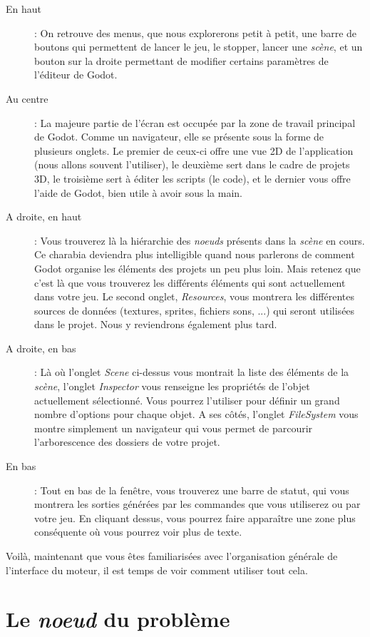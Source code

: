 \begin{description}
\item[En haut] : On retrouve des menus, que nous explorerons petit à petit, une barre de boutons qui permettent de lancer le jeu, le stopper, lancer une \emph{scène}, et un bouton sur la droite permettant de modifier certains paramètres de l'éditeur de Godot.
\item[Au centre] : La majeure partie de l'écran est occupée par la zone de travail principal de Godot. Comme un navigateur, elle se présente sous la forme de plusieurs onglets. Le premier de ceux-ci offre une vue 2D de l'application (nous allons souvent l'utiliser), le deuxième sert dans le cadre de projets 3D, le troisième sert à éditer les scripts (le code), et le dernier vous offre l'aide de Godot, bien utile à avoir sous la main.
\item[A droite, en haut] : Vous trouverez là la hiérarchie des \emph{noeuds} présents dans la \emph{scène} en cours. Ce charabia deviendra plus intelligible quand nous parlerons de comment Godot organise les éléments des projets un peu plus loin. Mais retenez que c'est là que vous trouverez les différents éléments qui sont actuellement dans votre jeu. Le second onglet, \emph{Resources}, vous montrera les différentes sources de données (textures, sprites, fichiers sons, ...) qui seront utilisées dans le projet. Nous y reviendrons également plus tard.
\item[A droite, en bas] : Là où l'onglet \emph{Scene} ci-dessus vous montrait la liste des éléments de la \emph{scène}, l'onglet \emph{Inspector} vous renseigne les propriétés de l'objet actuellement sélectionné. Vous pourrez l'utiliser pour définir un grand nombre d'options pour chaque objet. A ses côtés, l'onglet \emph{FileSystem} vous montre simplement un navigateur qui vous permet de parcourir l'arborescence des dossiers de votre projet.
\item[En bas] : Tout en bas de la fenêtre, vous trouverez une barre de statut, qui vous montrera les sorties générées par les commandes que vous utiliserez ou par votre jeu. En cliquant dessus, vous pourrez faire apparaître une zone plus conséquente où vous pourrez voir plus de texte.
\end{description}

Voilà, maintenant que vous êtes familiarisées avec l'organisation générale de l'interface du moteur, il est temps de voir comment utiliser tout cela.

\section{Le \emph{noeud} du problème}


